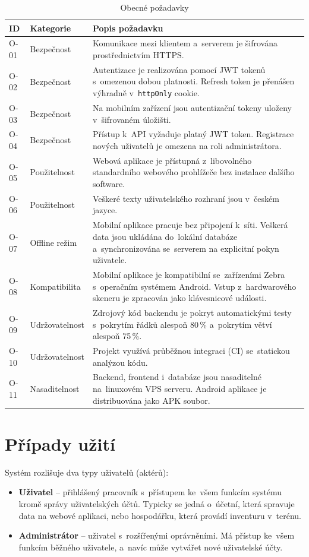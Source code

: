 \begin{table}[H]\centering
\renewcommand{\arraystretch}{1.4}
\caption{Obecné požadavky}\label{tab:nfreq}
\begin{tabular}{l|l|p{8.4cm}}
	\textbf{ID} & \textbf{Kategorie} & \textbf{Popis požadavku} \tabularnewline \hline
	O-01 & Bezpečnost & Komunikace mezi klientem a~serverem je šifrována prostřednictvím HTTPS. \tabularnewline
	O-02 & Bezpečnost & Autentizace je realizována pomocí JWT tokenů s~omezenou dobou platnosti. Refresh token je přenášen výhradně v~\texttt{httpOnly} cookie. \tabularnewline
	O-03 & Bezpečnost & Na mobilním zařízení jsou autentizační tokeny uloženy v~šifrovaném úložišti. \tabularnewline
	O-04 & Bezpečnost & Přístup k~API vyžaduje platný JWT token. Registrace nových uživatelů je omezena na roli administrátora. \tabularnewline
	O-05 & Použitelnost & Webová aplikace je přístupná z~libovolného standardního webového prohlížeče bez instalace dalšího software. \tabularnewline
	O-06 & Použitelnost & Veškeré texty uživatelského rozhraní jsou v~českém jazyce. \tabularnewline
	O-07 & Offline režim & Mobilní aplikace pracuje bez připojení k~síti. Veškerá data jsou ukládána do~lokální databáze a~synchronizována se~serverem na explicitní pokyn uživatele. \tabularnewline
	O-08 & Kompatibilita & Mobilní aplikace je kompatibilní se~zařízeními Zebra s~operačním systémem Android. Vstup z~hardwarového skeneru je zpracován jako klávesnicové události. \tabularnewline
	O-09 & Udržovatelnost & Zdrojový kód backendu je pokryt automatickými testy s~pokrytím řádků alespoň 80\,\% a~pokrytím větví alespoň 75\,\%. \tabularnewline
	O-10 & Udržovatelnost & Projekt využívá průběžnou integraci (CI) se~statickou analýzou kódu. \tabularnewline
	O-11 & Nasaditelnost & Backend, frontend i~databáze jsou nasaditelné na~linuxovém VPS serveru. Android aplikace je distribuována jako APK soubor. \tabularnewline
\end{tabular}
\end{table}

\section{Případy užití}

Systém rozlišuje dva typy uživatelů (aktérů):
\begin{itemize}
	\item \textbf{Uživatel} -- přihlášený pracovník s~přístupem ke~všem funkcím systému kromě správy uživatelských účtů. Typicky se jedná o~účetní, která spravuje data na webové aplikaci, nebo hospodářku, která provádí inventuru v~terénu.
	\item \textbf{Administrátor} -- uživatel s~rozšířenými oprávněními. Má přístup ke~všem funkcím běžného uživatele, a~navíc může vytvářet nové uživatelské účty.
\end{itemize}

